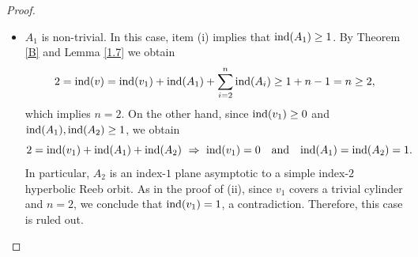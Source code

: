 \documentclass{amsart}
\newcommand{\CZ}{\mu_{CZ}^{\tau}}
\newcommand{\ind}{\textnormal{ind}}
\begin{document}
\begin{proof}
\begin{itemize}
\begin{itemize}
 If $n=3$, then
 $2=\ind(v_1)+\ind(A_2)+\ind(A_3),$
 where $\ind(v_1)\geq 0$ and $\ind(A_2),\ind(A_3)\geq 1$. It follows that
 $\ind(v_1)=0$  and $\ind(A_2)=\ind(A_3)=1.$
 From Theorem \ref{B}-(ii
88) we conclude that $A_2$ and $A_3$ are planes. Since $v_1$ has three negative ends, say in $\alpha^{d_1},\alpha^{d_2}$ and $\alpha^{d_3}$, we can assume without loss of generality that $A_2$ and $ A_3$ are asymptotic to $\alpha^{d_2}$ and $\alpha^{d_3}$ at their positive ends, respectively. Our hypotheses on the index-$2$ orbits imply that $\alpha$ is simple and $d_2=d_3=1$.  In particular, $\alpha$ is hyperbolic and $\CZ(\alpha)=2$. Taking a trivialization $\tau$ of $\xi$ along $\alpha$ we obtain an induced trivialization of $v_1^*\xi$. This trivialization, also denoted by $\tau$, induces a trivialization of $\xi$ along each of its asymptotic limits, which are iterated from $\alpha$.  So,
 \begin{eqnarray*}
 \ind(v_1) &=& -(2-4)+\CZ(\alpha^{d_1+d_2+d_3})-\CZ(\alpha^{d_1})-\CZ(\alpha^{d_2} )-\CZ(\alpha^{d_3})\\
 &=& 2 + (d_1+2)\mu^{\tau}_{CZ}(\alpha)-d_1 \mu^{\tau}_{CZ}(\alpha)- \mu^{\tau}_{CZ}(\alpha)-  \mu^{\tau}_{CZ}(\alpha)\\
 &=& 2,
 \end{eqnarray*}
  contradicting  $\ind(v_1)=0$. We conclude that $v_1$ cannot have three negative ends and the case $n=3$ is ruled out.

 \item $A_1$ is non-trivial. In this case, item (i)  implies that $\ind(A_1)\geq 1$. By Theorem \ref{B} and  Lemma \ref{1.7} we obtain
 $$2=\ind(v)=\ind(v_1)+\ind(A_1)+\sum_{i=2}^n \ind(A_i) \geq 1+n-1=n \geq 2,$$
 which implies  $n=2$. On the other hand, since $\ind(v_1)\geq 0$ and $\ind(A_1),\ind(A_2)\geq 1$, we obtain
 $$2=\ind(v_1)+\ind(A_1)+\ind(A_2) \,\, \Rightarrow \,\, \ind(v_1)=0 \ \ \mbox{ and } \ \ \ind(A_1)=\ind (A_2)=1.$$
 In particular, $A_2$ is an index-$1$ plane asymptotic to a simple index-$2$ hyperbolic Reeb orbit. As in the proof of  (ii), since $v_1$ covers a trivial cylinder and $n=2$, we conclude that $\ind(v_1) =1$, a contradiction. Therefore, this case is ruled out.
 \end{itemize}


\end{itemize}
\end{proof}
\end{document}
